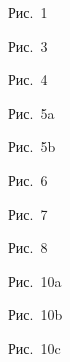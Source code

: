 



\begin{center}
    \def\labelbox#1#2#3{\parbox[c]{#1}{\centering#3\par
    Рис.~#2\par\vspace{1ex}\null}}%

\labelbox{6.5cm} {1} {}
\labelbox{5.0cm} {3} {}
\labelbox{5.5cm} {4} {}
\labelbox{5.5cm} {5a}{}
\labelbox{6.0cm} {5b}{}
\labelbox{5.5cm} {6} {}
\labelbox{3.2cm} {7} {}
\labelbox{5.5cm} {8} {}
\labelbox{5.5cm}{10a}{}
\labelbox{6.0cm}{10b}{}
\labelbox{4.7cm}{10c}{}

\end{center}

\clearpage


